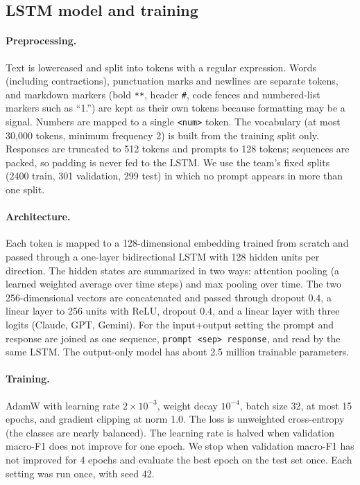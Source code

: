 \subsection{LSTM model and training}
\paragraph{Preprocessing.} Text is lowercased and split into tokens with a regular expression. Words (including contractions), punctuation marks and newlines are separate tokens, and markdown markers (bold \texttt{**}, header \texttt{\#}, code fences and numbered-list markers such as ``1.'') are kept as their own tokens because formatting may be a signal. Numbers are mapped to a single \texttt{<num>} token. The vocabulary (at most 30{,}000 tokens, minimum frequency 2) is built from the training split only. Responses are truncated to 512 tokens and prompts to 128 tokens; sequences are packed, so padding is never fed to the LSTM. We use the team's fixed splits (2400 train, 301 validation, 299 test) in which no prompt appears in more than one split.

\paragraph{Architecture.} Each token is mapped to a 128-dimensional embedding trained from scratch and passed through a one-layer bidirectional LSTM with 128 hidden units per direction. The hidden states are summarized in two ways: attention pooling (a learned weighted average over time steps) and max pooling over time. The two 256-dimensional vectors are concatenated and passed through dropout $0.4$, a linear layer to 256 units with ReLU, dropout $0.4$, and a linear layer with three logits (Claude, GPT, Gemini). For the input+output setting the prompt and response are joined as one sequence, \texttt{prompt <sep> response}, and read by the same LSTM. The output-only model has about 2.5 million trainable parameters.

\paragraph{Training.} AdamW with learning rate $2\times10^{-3}$, weight decay $10^{-4}$, batch size 32, at most 15 epochs, and gradient clipping at norm 1.0. The loss is unweighted cross-entropy (the classes are nearly balanced). The learning rate is halved when validation macro-F1 does not improve for one epoch. We stop when validation macro-F1 has not improved for 4 epochs and evaluate the best epoch on the test set once. Each setting was run once, with seed 42.

